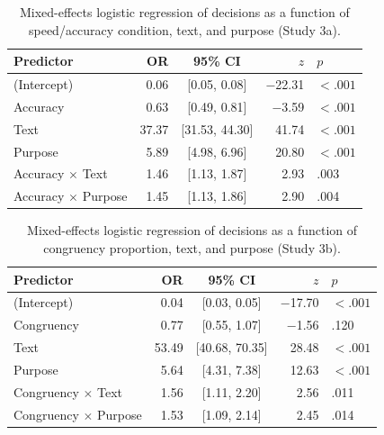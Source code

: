 \documentclass[pdflatex,sn-nature]{sn-jnl}
\begin{document}
\begin{appendices}
\begin{table}[htbp]
\caption{Mixed-effects logistic regression of decisions as a function of speed/accuracy condition, text, and purpose (Study 3a).}
\label{tab:S6}
\begin{tabular*}{\textwidth}{@{\extracolsep{\fill}}lrcrl@{}}
\toprule
Predictor & OR & 95\% CI & $z$ & $p$ \\
\midrule
(Intercept)                   & 0.06  & [0.05, 0.08]  & $-$22.31 & $<.001$ \\
Accuracy                      & 0.63  & [0.49, 0.81]  & $-$3.59  & $<.001$ \\
Text                          & 37.37 & [31.53, 44.30] & 41.74   & $<.001$ \\
Purpose                       & 5.89  & [4.98, 6.96]  & 20.80   & $<.001$ \\
Accuracy $\times$ Text        & 1.46  & [1.13, 1.87]  & 2.93    & .003    \\
Accuracy $\times$ Purpose     & 1.45  & [1.13, 1.86]  & 2.90    & .004    \\
\bottomrule
\end{tabular*}
\end{table}

\begin{table}[htbp]
\caption{Mixed-effects logistic regression of decisions as a function of congruency proportion, text, and purpose (Study 3b).}
\label{tab:S7}
\begin{tabular*}{\textwidth}{@{\extracolsep{\fill}}lrcrl@{}}
\toprule
Predictor & OR & 95\% CI & $z$ & $p$ \\
\midrule
(Intercept)                      & 0.04  & [0.03, 0.05]  & $-$17.70 & $<.001$ \\
Congruency                       & 0.77  & [0.55, 1.07]  & $-$1.56  & .120    \\
Text                             & 53.49 & [40.68, 70.35] & 28.48   & $<.001$ \\
Purpose                          & 5.64  & [4.31, 7.38]  & 12.63   & $<.001$ \\
Congruency $\times$ Text         & 1.56  & [1.11, 2.20]  & 2.56    & .011    \\
Congruency $\times$ Purpose      & 1.53  & [1.09, 2.14]  & 2.45    & .014    \\
\bottomrule
\end{tabular*}
\end{table}


\end{appendices}
\end{document}
